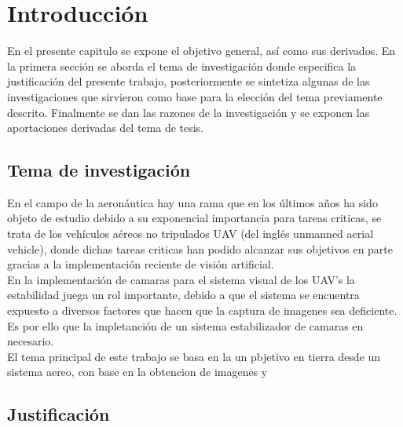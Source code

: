 \chapter{Introducción}
En el presente capitulo se expone el objetivo general, así como sus derivados. En la
primera sección se aborda el tema de investigación donde especifica la justificación del
presente trabajo, posteriormente se sintetiza algunas de las investigaciones que sirvieron
como base para la elección del tema previamente descrito. Finalmente se dan las razones
de la investigación y se exponen las aportaciones derivadas del tema de tesis.

\section{Tema de investigación}
En el campo de la aeronáutica hay una rama que en los últimos años ha sido objeto
de estudio debido a su exponencial importancia para tareas criticas, se trata de los
vehículos aéreos no tripulados UAV (del inglés unmanned aerial vehicle), donde dichas 
tareas criticas han podido alcanzar sus objetivos en parte gracias a la implementación
reciente de visión artificial.\\
En la implementación de camaras para el sistema visual de los UAV's la estabilidad
juega un rol importante, debido a que el sistema se encuentra expuesto a diversos
factores que hacen que la captura de imagenes sea deficiente. Es por ello que la
impletanción de un sistema estabilizador de camaras en necesario.\\
El tema principal de este trabajo se basa en la  un pbjetivo en tierra desde un 
sistema aereo, con base en la obtencion de imagenes y 

\section{Justificación}


